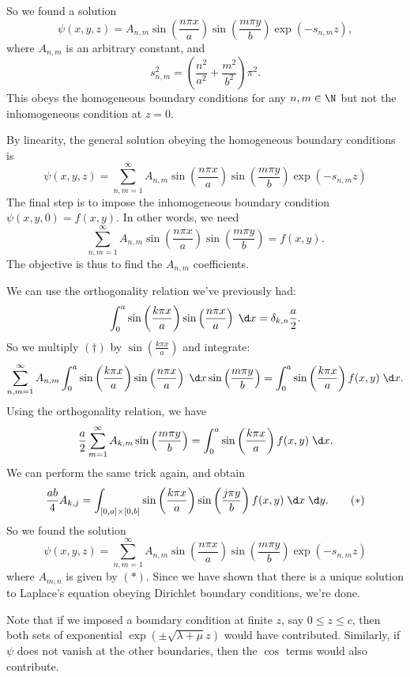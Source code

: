 \documentclass[a4paper]{article}
\begin{document}
So we found a solution
\[
  \psi(x, y, z) = A_{n, m}\sin \left(\frac{n\pi x}{a}\right) \sin \left(\frac{m\pi y}{b}\right) \exp(-s_{n, m} z),
\]
where $A_{n, m}$ is an arbitrary constant, and
\[
  s_{n, m}^2 = \left(\frac{n^2}{a^2} + \frac{m^2}{b^2}\right)\pi^2.
\]
This obeys the homogeneous boundary conditions for any $n, m \in \N$ but not the inhomogeneous condition at $z = 0$.

By linearity, the general solution obeying the homogeneous boundary conditions is
\[
  \psi(x, y, z) = \sum_{n, m = 1}^{\infty} A_{n, m} \sin\left(\frac{n\pi x}{a}\right) \sin \left(\frac{m\pi y}{b}\right) \exp(-s_{n, m} z)
\]
The final step is to impose the inhomogeneous boundary condition $\psi(x, y, 0) = f(x, y)$. In other words, we need
\[
  \sum_{n, m = 1}^{\infty} A_{n, m} \sin\left(\frac{n\pi x}{a}\right) \sin \left(\frac{m\pi y}{b}\right)  = f(x, y). \tag{$\dagger$}
\]
The objective is thus to find the $A_{n, m}$ coefficients.

We can use the orthogonality relation we've previously had:
\[
  \int_0^a \sin\left(\frac{k\pi x}{a}\right) \sin \left(\frac{n\pi x}{a}\right)\;\d x = \delta_{k, n} \frac{a}{2}.
\]
So we multiply $(\dagger)$ by $\sin \left(\frac{k\pi x}{a}\right)$ and integrate:
\[
  \sum_{n, m = 1}^\infty A_{n, m}\int_0^a \sin \left(\frac{k\pi x}{a}\right) \sin \left(\frac{n\pi x}{a}\right)\;\d x \sin\left(\frac{m\pi y}{b}\right) = \int_0^a \sin\left(\frac{k \pi x}{a}\right)f(x, y) \;\d x.
\]
Using the orthogonality relation, we have
\[
  \frac{a}{2}\sum_{m = 1}^\infty A_{k, m} \sin\left(\frac{m\pi y}{b}\right) = \int_0^a \sin\left(\frac{k\pi x}{a}\right) f(x, y)\;\d x.
\]
We can perform the same trick again, and obtain
\[
  \frac{ab}{4}A_{k, j} = \int_{[0, a]\times [0, b]}\sin \left(\frac{k\pi x}{a}\right) \sin\left(\frac{j\pi y}{b}\right) f(x, y)\;\d x\;\d y.\tag{$*$}
\]
So we found the solution
\[
  \psi(x, y, z) = \sum_{n, m = 1}^{\infty} A_{n, m} \sin\left(\frac{n\pi x}{a}\right) \sin \left(\frac{m\pi y}{b}\right) \exp(-s_{n, m} z)
\]
where $A_{m, n}$ is given by $(*)$.  Since we have shown that there is a unique solution to Laplace's equation obeying Dirichlet boundary conditions, we're done.

Note that if we imposed a boundary condition at finite $z$, say $0 \leq z \leq c$, then both sets of exponential $\exp (\pm \sqrt{\lambda + \mu} z)$ would have contributed. Similarly, if $\psi$ does not vanish at the other boundaries, then the $\cos$ terms would also contribute.
\end{document}
